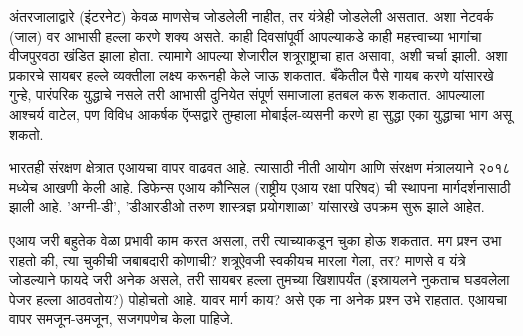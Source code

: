 अंतरजालाद्वारे (इंटरनेट) केवळ माणसेच जोडलेली नाहीत, तर यंत्रेही जोडलेली असतात. अशा नेटवर्क (जाल) वर आभासी हल्ला करणे शक्य असते. काही दिवसांपूर्वी आपल्याकडे काही महत्त्वाच्या भागांचा वीजपुरवठा खंडित झाला होता. त्यामागे आपल्या शेजारील शत्रूराष्ट्राचा हात असावा, अशी चर्चा झाली. अशा प्रकारचे सायबर हल्ले व्यक्तीला लक्ष्य करूनही केले जाऊ शकतात. बँकेतील पैसे गायब करणे यांसारखे गुन्हे, पारंपरिक युद्धाचे नसले तरी आभासी दुनियेत संपूर्ण समाजाला हतबल करू शकतात. आपल्याला आश्चर्य वाटेल, पण विविध आकर्षक ऍप्सद्वारे तुम्हाला मोबाईल-व्यसनी करणे हा सुद्धा एका युद्धाचा भाग असू शकतो.

भारतही संरक्षण क्षेत्रात एआयचा वापर वाढवत आहे. त्यासाठी नीती आयोग आणि संरक्षण मंत्रालयाने २०१८ मध्येच आखणी केली आहे.  डिफेन्स एआय कौन्सिल (राष्ट्रीय एआय रक्षा परिषद) ची स्थापना मार्गदर्शनासाठी झाली आहे. 'अग्नी-डी', 'डीआरडीओ तरुण शास्त्रज्ञ प्रयोगशाळा' यांसारखे उपक्रम सुरू झाले आहेत.

एआय जरी बहुतेक वेळा प्रभावी काम करत असला, तरी त्याच्याकडून चुका होऊ शकतात. मग प्रश्न उभा राहतो की, त्या चुकीची जबाबदारी कोणाची? शत्रूऐवजी स्वकीयच मारला गेला, तर? माणसे व यंत्रे जोडल्याने फायदे जरी अनेक असले, तरी सायबर हल्ला तुमच्या खिशापर्यंत (इस्रायलने नुकताच घडवलेला पेजर हल्ला आठवतोय?) पोहोचतो आहे. यावर मार्ग काय? असे एक ना अनेक प्रश्न उभे राहतात. एआयचा वापर समजून-उमजून, सजगपणेच केला पाहिजे.